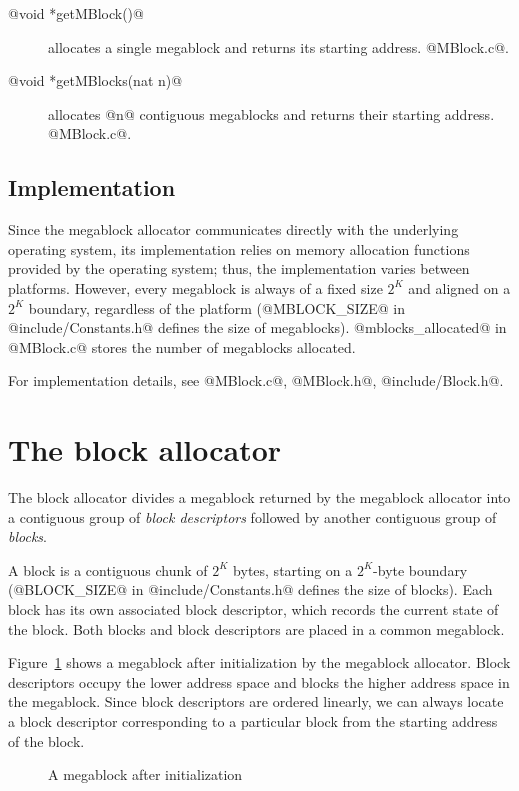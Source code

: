 \documentclass{article}
\begin{document}
\begin{description}
\item[@void *getMBlock()@] allocates a single megablock and returns its 
starting address. @MBlock.c@.
\item[@void *getMBlocks(nat n)@] allocates @n@ contiguous megablocks 
and returns their starting address. @MBlock.c@.
\end{description}

\subsection{Implementation}

Since the megablock allocator communicates directly with the underlying
operating system, its implementation relies on memory allocation functions
provided by the operating system; thus, the implementation varies between
platforms. 
However, every megablock is always of a fixed size $2^K$ and aligned on a 
$2^K$ boundary, regardless of the platform 
(@MBLOCK_SIZE@ in @include/Constants.h@ defines the size of megablocks).
@mblocks_allocated@ in @MBlock.c@ stores the number of megablocks allocated.

For implementation details, see @MBlock.c@, @MBlock.h@, @include/Block.h@. 

\section{The block allocator}

The block allocator divides a megablock returned by the megablock allocator
into a contiguous group of \emph{block descriptors} followed by another 
contiguous group of \emph{blocks}. 

A block is a contiguous chunk of $2^K$ bytes, starting on 
a $2^K$-byte boundary (@BLOCK_SIZE@ in 
@include/Constants.h@ defines the size of blocks). 
Each block has its own associated block descriptor, which records the
current state of the block. 
Both blocks and block descriptors are placed in a common megablock.

Figure~\ref{fig-megablock} shows a megablock after initialization by the 
megablock allocator. 
Block descriptors occupy the lower address space and blocks the higher address 
space in the megablock. 
Since block descriptors are ordered linearly, we can always locate a block 
descriptor corresponding to a particular block from the starting address 
of the block.

\begin{figure}[ht]
\begin{center}

\caption{A megablock after initialization}
\label{fig-megablock}
\end{center}
\end{figure}
\end{document}
